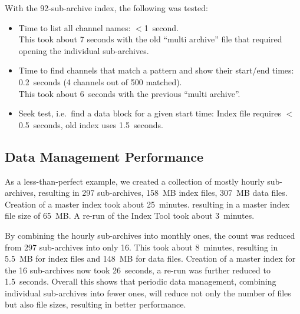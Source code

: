 
\noindent With the 92-sub-archive index, the following was tested:
\begin{itemize}
\item Time to list all channel names: $<$1~second.\\
      This took about 7 seconds with the old ``multi archive'' file
      that required opening the individual sub-archives.
\item Time to find channels that match a pattern and show their
      start/end times: 0.2~seconds (4 channels out of 500 matched).\\
      This took about 6~seconds with the previous ``multi archive''.
\item Seek test, i.e.\ find a data block for a given start time:
      Index file requires $<$0.5~seconds, old index uses 1.5~seconds.
\end{itemize}

\subsection{Data Management Performance}
As a less-than-perfect example, we created a collection of mostly
hourly sub-archives, resulting in 297 sub-archives, 158~MB index
files, 307~MB data files.  Creation of a master index took about
25~minutes.  resulting in a master index file size of 65~MB.  A re-run
of the Index Tool took about 3~minutes.

By combining the hourly sub-archives into monthly ones, the count was
reduced from 297 sub-archives into only 16.  This took about
8~minutes, resulting in 5.5~MB for index files and 148~MB for data
files. Creation of a master index for the 16 sub-archives now took
26~seconds, a re-run was further reduced to 1.5~seconds.
Overall this shows that periodic data management, combining individual
sub-archives into fewer ones, will reduce not only the number of files
but also file sizes, resulting in better performance.

